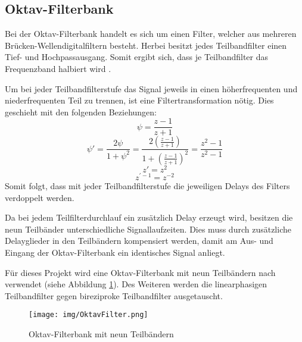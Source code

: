 \subsection{Oktav-Filterbank}
Bei der Oktav-Filterbank handelt es sich um einen Filter, welcher aus mehreren Brücken-Wellendigitalfiltern besteht. Herbei besitzt jedes Teilbandfilter einen Tief- und Hochpassausgang. Somit ergibt sich, dass je Teilbandfilter das Frequenzband halbiert wird \cite[vgl.][S. 90]{kunold1989}.\par
Um bei jeder Teilbandfilterstufe das Signal jeweils in einen höherfrequenten und niederfrequenten Teil zu trennen, ist eine Filtertransformation nötig. Dies geschieht mit den folgenden Beziehungen:
\begin{equation}
\psi = \frac{z - 1}{z + 1}
\end{equation}
\begin{equation}
\psi' = \frac{2 \psi}{1 + \psi^2} = \frac{2 \left(\frac{z - 1}{z + 1}\right)}{1 + \left(\frac{z - 1}{z + 1}\right)^2} = \frac{z^2 - 1}{z^2 - 1}
\end{equation}
\begin{equation}
z' = z^2
\end{equation}
\begin{equation}
z^{'-1} = z^{-2}
\end{equation}
Somit folgt, dass mit jeder Teilbandfilterstufe die jeweiligen Delays des Filters verdoppelt werden.\par
Da bei jedem Teilfilterdurchlauf ein zusätzlich Delay erzeugt wird, besitzen die neun Teilbänder unterschiedliche Signallaufzeiten. Dies muss durch zusätzliche Delayglieder in den Teilbändern kompensiert werden, damit am Aus- und Eingang der Oktav-Filterbank ein identisches Signal anliegt.\par
Für dieses Projekt wird eine Oktav-Filterbank mit neun Teilbändern nach \cite[][]{kunold1989} verwendet (siehe Abbildung \ref{fig:OktavFilterbank}). Des Weiteren werden die linearphasigen Teilbandfilter gegen bireziproke Teilbandfilter ausgetauscht.
\begin{figure}[h!]
	\centering	\texttt{[image: img/OktavFilter.png]}
	\caption{Oktav-Filterbank mit neun Teilbändern \cite[][S. 95]{kunold1989}}
	\label{fig:OktavFilterbank}
\end{figure}
